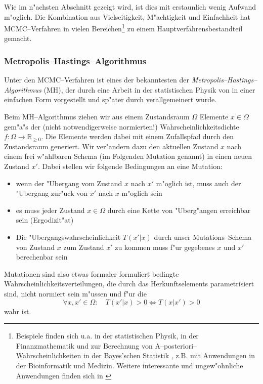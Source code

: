 \documentclass[11pt,a4paper,DIVcalc,BCOR8mm,titlepage,twoside]{scrartcl}
\begin{document}
	Wie im n"achsten Abschnitt gezeigt wird, ist dies mit erstaunlich wenig Aufwand m"oglich. Die Kombination aus Vielseitigkeit, M"achtigkeit und Einfachheit hat MCMC--Verfahren in vielen Bereichen\footnote{Beispiele finden sich u.a. in der statistischen Physik, in der Finanzmathematik und zur Berechnung von A--posteriori--Wahrscheinlichkeiten in der Bayes'schen Statistik \citep{Geweke:1989p10465}, z.B. mit Anwendungen in der Bioinformatik und Medizin. Weitere interessante und ungew"ohnliche Anwendungen finden sich in \citep{Diaconis:2009p4122}} zu einem Hauptverfahrensbestandteil gemacht.
	
	
	\subsubsection{Metropolis--Hastings--Algorithmus}
	Unter den MCMC--Verfahren ist eines der bekanntesten der {\em Metropolis--Hastings--Algorithmus} (MH), der durch eine Arbeit in der statistischen Physik von \citet{Metropolis:1953p3364} in einer einfachen Form vorgestellt und sp"ater durch \citet{Hastings:1970p3387} verallgemeinert wurde.

	Beim MH--Algorithmus ziehen wir aus einem Zustandsraum $\Omega$ Elemente $x \in \Omega$ gem"a"s der (nicht notwendigerweise normierten!) Wahrscheinlichkeitsdichte $f : \Omega \rightarrow \mathbb{R}_{\geq 0}$. Die Elemente werden dabei mit einem Zufallspfad durch den Zustandsraum generiert. Wir ver"andern dazu den aktuellen Zustand $x$ nach einem frei w"ahlbaren Schema (im Folgenden Mutation genannt) in einen neuen Zustand $x'$.
	Dabei stellen wir folgende Bedingungen an eine Mutation:
	\begin{itemize}
		\item{wenn der "Ubergang vom Zustand $x$ nach $x'$ m"oglich ist, muss auch der "Ubergang zur"uck von $x'$ nach $x$ m"oglich sein}
		\item{es muss jeder Zustand $x \in \Omega$ durch eine Kette von "Uberg"angen erreichbar sein (Ergodizit"at)}
		\item{Die "Ubergangswahrscheinlichkeit $T(x'|x)$ durch unser Mutations--Schema von Zustand $x$ zum Zustand $x'$ zu kommen muss f"ur gegebenes $x$ und $x'$ berechenbar sein}
	\end{itemize}
	Mutationen sind also etwas formaler formuliert bedingte Wahrscheinlichkeitsverteilungen, die durch das Herkunftselements parametrisiert sind, nicht normiert sein m"ussen und f"ur die
	$$\forall x,x'\in\Omega : \quad T(x'|x)>0 \Leftrightarrow T(x|x')>0$$
	wahr ist.
	
\end{document}
